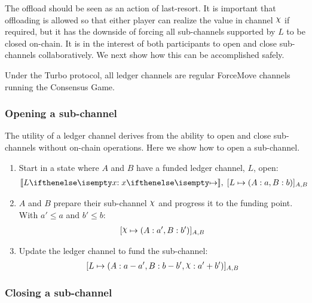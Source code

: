 \documentclass{article}
\begin{document}
The offload should be seen as an action of last-resort.
It is important that offloading is allowed so that either player can realize the value in channel $\rchi$ if required, but it has the downside of forcing all sub-channels supported by $L$ to be closed on-chain.
It is in the interest of both participants to open and close sub-channels collaboratively.
We next show how this can be accomplished safely.

Under the Turbo protocol, all ledger channels are regular ForceMove channels running the Consensus Game.

\subsubsection{Opening a sub-channel}

The utility of a ledger channel derives from the ability to open and close sub-channels without on-chain operations.
Here we show how to open a sub-channel.
\begin{enumerate}
  \item Start in a state where $A$ and $B$ have a funded ledger channel, $L$, open:
  \begin{align}
    \adj{\holds{L}{x}{}}, \; \finalizable{L}{\alloc{A: a, B: b}}{A, B}
  \end{align}
  \item $A$ and $B$ prepare their sub-channel $\rchi$ and progress it to the funding point. With $a' \leq a$ and $b' \leq b$:
  \begin{align}
    \finalizable{\rchi}{\alloc{A:a', B:b'}}{A,B}
  \end{align}
  \item Update the ledger channel to fund the sub-channel:
  \begin{align}
    \finalizable{L}{\alloc{A:a-a', B: b - b', \rchi: a' + b'}}{A,B}
  \end{align}
\end{enumerate}

\subsubsection{Closing a sub-channel}
\end{document}
